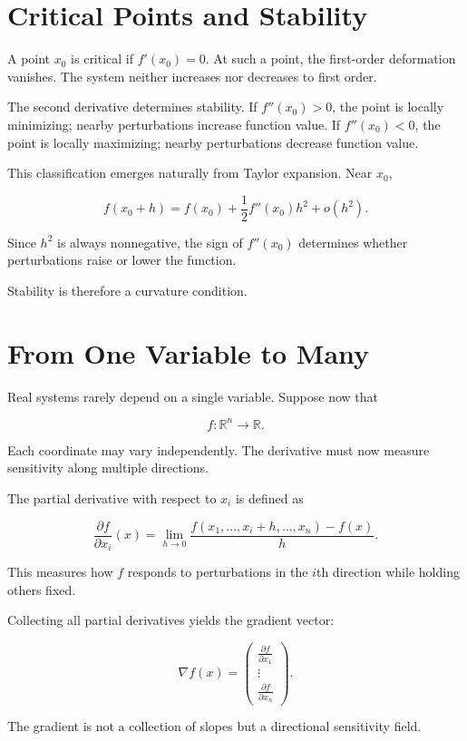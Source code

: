 \documentclass[12pt]{book}
\begin{document}
\section{Critical Points and Stability}

A point $x_0$ is critical if $f'(x_0) = 0$. At such a point, the first-order deformation vanishes. The system neither increases nor decreases to first order.

The second derivative determines stability. If $f''(x_0) > 0$, the point is locally minimizing; nearby perturbations increase function value. If $f''(x_0) < 0$, the point is locally maximizing; nearby perturbations decrease function value.

This classification emerges naturally from Taylor expansion. Near $x_0$,

\[
f(x_0 + h) = f(x_0) + \frac{1}{2}f''(x_0)h^2 + o(h^2).
\]

Since $h^2$ is always nonnegative, the sign of $f''(x_0)$ determines whether perturbations raise or lower the function.

Stability is therefore a curvature condition.

\section{From One Variable to Many}

Real systems rarely depend on a single variable. Suppose now that

\[
f : \mathbb{R}^n \to \mathbb{R}.
\]

Each coordinate may vary independently. The derivative must now measure sensitivity along multiple directions.

The partial derivative with respect to $x_i$ is defined as

\[
\frac{\partial f}{\partial x_i}(x) = \lim_{h \to 0} \frac{f(x_1, \dots, x_i + h, \dots, x_n) - f(x)}{h}.
\]

This measures how $f$ responds to perturbations in the $i$th direction while holding others fixed.

Collecting all partial derivatives yields the gradient vector:

\[
\nabla f(x) =
\begin{pmatrix}
\frac{\partial f}{\partial x_1} \\
\vdots \\
\frac{\partial f}{\partial x_n}
\end{pmatrix}.
\]

The gradient is not a collection of slopes but a directional sensitivity field.
\end{document}
